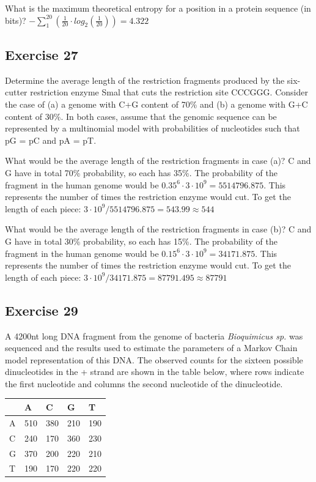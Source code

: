 What is the maximum theoretical entropy for a position in a protein sequence (in bits)?  $- \sum_{1}^{20} (\frac{1}{20} \cdot log_2(\frac{1}{20})) = 4.322$

\subsection{Exercise 27}
Determine the average length of the restriction fragments produced by the six-cutter restriction enzyme Smal that cuts the restriction site CCCGGG. Consider the case of (a) a genome with C+G content of 70\% and (b) a genome with G+C content of 30\%. In both cases, assume that the genomic sequence can be represented by a multinomial model with probabilities of nucleotides such that pG = pC and pA = pT. 

What would be the average length of the restriction fragments in case (a)? 
C and G have in total 70\% probability, so each has 35\%. The probability of the fragment in the human genome would be $0.35^6 \cdot 3 \cdot 10^9 = 5514796.875$. This represents the number of times the restriction enzyme would cut. To get the length of each piece: $3 \cdot 10^9 / 5514796.875 = 543.99 \approx 544$

What would be the average length of the restriction fragments in case (b)? 
C and G have in total 30\% probability, so each has 15\%. The probability of the fragment in the human genome would be $0.15^6 \cdot 3 \cdot 10^9 = 34171.875$. This represents the number of times the restriction enzyme would cut. To get the length of each piece: $3 \cdot 10^9 / 34171.875 = 87791.495 \approx 87791$

\subsection{Exercise 29}
A 4200nt long DNA fragment from the genome of bacteria \textit{Bioquimicus sp.} was sequenced and the results used to estimate the parameters of a Markov Chain model representation of this DNA. The observed counts for the sixteen possible dinucleotides in the + strand are shown in the table below, where rows indicate the first nucleotide and columns the second nucleotide of the dinucleotide.

\begin{table}[htbp]
\centering
\begin{tabular}{l | l l l l }
& A & C & G & T \\ \hline
A & 510 & 380 & 210 & 190 \\
C & 240 & 170 & 360 & 230 \\
G & 370 & 200 & 220 & 210 \\
T & 190 & 170 & 220 & 220
\end{tabular}
\end{table}

